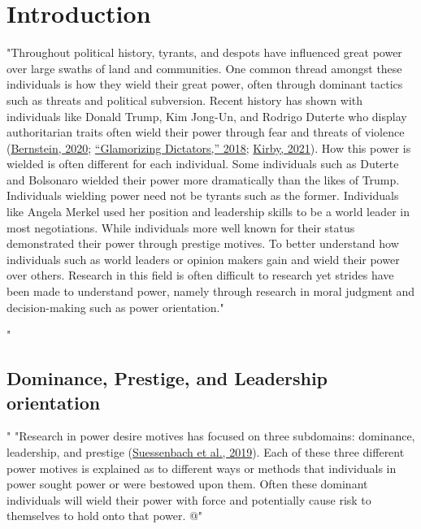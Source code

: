 \documentclass[
"  donotrepeattitle,doc, 12pt, a4paper,floatsintext]{apa7}"
\date{}
\begin{document}
\maketitle
\hypertarget{introduction}{%
\section{Introduction}\label{introduction}}
"Throughout political history, tyrants, and despots have influenced great power over large swaths of land and communities. One common thread amongst these individuals is how they wield their great power, often through dominant tactics such as threats and political subversion. Recent history has shown with individuals like Donald Trump, Kim Jong-Un, and Rodrigo Duterte who display authoritarian traits often wield their power through fear and threats of violence (\protect\hyperlink{ref-bernstein2020}{Bernstein, 2020}; \protect\hyperlink{ref-2018}{{``Glamorizing Dictators,''} 2018}; \protect\hyperlink{ref-kirby2021}{Kirby, 2021}). How this power is wielded is often different for each individual. Some individuals such as Duterte and Bolsonaro wielded their power more dramatically than the likes of Trump. Individuals wielding power need not be tyrants such as the former. Individuals like Angela Merkel used her position and leadership skills to be a world leader in most negotiations. While individuals more well known for their status demonstrated their power through prestige motives. To better understand how individuals such as world leaders or opinion makers gain and wield their power over others. Research in this field is often difficult to research yet strides have been made to understand power, namely through research in moral judgment and decision-making such as power orientation."
\hypertarget{dominance-prestige-and-leadership-orientation}{%
"\subsection{Dominance, Prestige, and Leadership orientation}\label{dominance-prestige-and-leadership-orientation}}"
"Research in power desire motives has focused on three subdomains: dominance, leadership, and prestige (\protect\hyperlink{ref-suessenbach2019}{Suessenbach et al., 2019}). Each of these three different power motives is explained as to different ways or methods that individuals in power sought power or were bestowed upon them. Often these dominant individuals will wield their power with force and potentially cause risk to themselves to hold onto that power. @"
\end{document}
